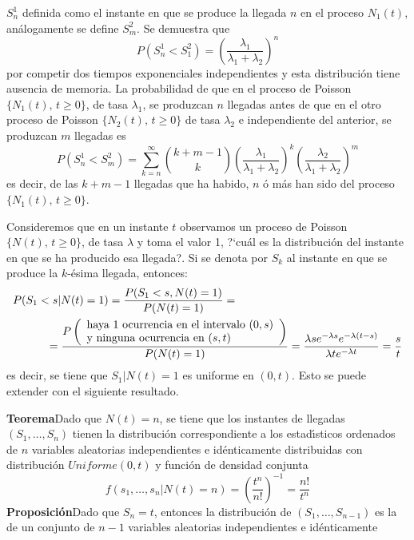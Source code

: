 $S_n^1$ definida como el instante en que se produce la llegada $n$
en el proceso $N_1(t)$, an\'{a}logamente se define $S_m^2$. Se
demuestra que
\[
P(S_n^1<S_1^2)=\left
(\dfrac{\lambda_1}{\lambda_1+\lambda_2}\right )^n
\]
por competir dos tiempos exponenciales independientes y esta
distribuci\'{o}n tiene ausencia de memoria. La probabilidad de que en
el proceso de Poisson $\{N_1(t),\,t\geq 0\}$, de tasa
$\lambda_1$, se produzcan $n$ llegadas antes de que en el otro
proceso de Poisson $\{N_2(t),\,t\geq 0\}$ de tasa $\lambda_2$ e
independiente del anterior, se produzcan $m$ llegadas es
\[
P(S_n^1<S_m^2)=\displaystyle\sum_{k=n}^{\infty}{k+m-1 \choose
k}\left (\dfrac{\lambda_1}{\lambda_1+\lambda_2}\right )^k \left
(\dfrac{\lambda_2}{\lambda_1+\lambda_2}\right )^{m}
\]
es decir, de las $k+m-1$ llegadas que ha habido, $n$ \'{o} m\'{a}s han
sido del proceso $\{N_1(t),\,t\geq 0\}$.
\par
Consideremos que en un instante $t$ observamos un proceso de
Poisson $\{N(t),\,t\geq 0\}$, de tasa $\lambda$ y toma el valor 1,
?`cu\'{a}l es la distribuci\'{o}n del instante en que se ha producido esa
llegada?. Si se denota por $S_k$ al instante en que se produce la
$k$-\'{e}sima llegada, entonces:
\[
\begin{array}{l}
P(S_1<s|N(t)=1)=\dfrac{P(S_1<s, N(t)=1)}{P( N(t)=1)}=\\[10pt]
\hbox{}\hspace{30pt}=\dfrac{P\left(\begin{array}{l}\text{haya 1
ocurrencia en el intervalo $(0,s)$}\\ \text{y ninguna ocurrencia
en $(s,t)$}\end{array}\right )}{P(N(t)=1)}=\dfrac{\lambda s
e^{-\lambda s}e^{-\lambda(t-s)}}{\lambda t e^{-\lambda
t}}=\dfrac{s}{t}
\end{array}
\]
es decir, se tiene que $S_1|N(t)=1$ es uniforme en $(0,t)$. Esto
se puede extender con el siguiente resultado.
\par
{\bf Teorema}\hfill\break Dado que $N(t)=n$, se tiene que los
instantes de llegadas $(S_1,\ldots,S_n)$ tienen la distribuci\'{o}n
correspondiente a los estad\'{\i}sticos ordenados de $n$ variables
aleatorias independientes e id\'{e}nticamente distribuidas con
distribuci\'{o}n $Uniforme(0,t)$ y funci\'{o}n de densidad conjunta
\[
f(s_1,\ldots,s_n|N(t)=n)=\left(\dfrac{t^n}{n!}\right)^{-1}=\dfrac{n!}{t^n}
\]
{\bf Proposici\'{o}n}\hfill\break Dado que $S_n=t$, entonces la
distribuci\'{o}n de $(S_1,\ldots,S_{n-1})$ es la de un conjunto de
$n-1$ variables aleatorias independientes e id\'{e}nticamente
